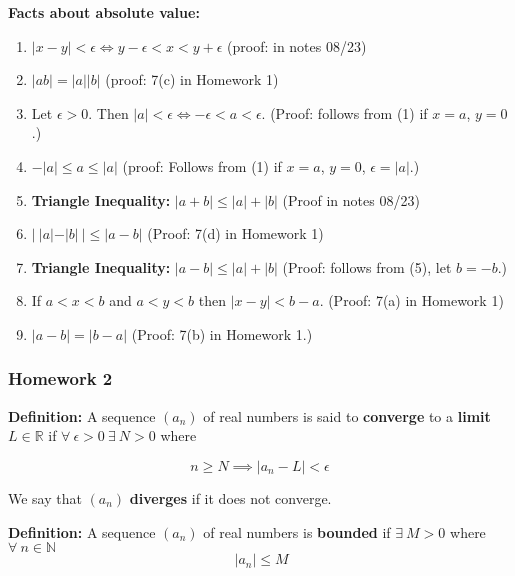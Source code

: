 
\textbf{Facts about absolute value:}

\begin{enumerate}[(1)]

\item \(|x-y| < \epsilon \iff y - \epsilon < x < y + \epsilon\) (proof: in notes 08/23)

\item \(|ab| = |a||b|\) (proof: 7(c) in Homework 1)

\item Let \(\epsilon >0\). Then \(|a| < \epsilon \iff -\epsilon < a < \epsilon\). (Proof: follows from (1) if \(x = a\), \(y = 0\).)

\item \(-|a| \leq a \leq |a|\) (proof: Follows from (1) if \(x = a\), \(y = 0\), \(\epsilon = |a|\).)

\item \textbf{Triangle Inequality:} \(|a + b| \leq |a| + |b|\) (Proof in notes 08/23)

\item \(|\ |a| - |b| \ | \leq |a - b|\) (Proof: 7(d) in Homework 1)

\item \textbf{Triangle Inequality:} \(|a - b| \leq |a| + |b|\) (Proof: follows from (5), let \(b = -b\).)

\item If \(a < x < b\) and \(a < y < b\) then \(|x - y| < b - a\). (Proof: 7(a) in Homework 1)

\item \(|a - b| = |b - a|\) (Proof: 7(b) in Homework 1.)

\end{enumerate}

\subsubsection{Homework 2}

\textbf{Definition:} A sequence \((a_n)\) of real numbers is said to \textbf{converge} to a \textbf{limit} \(L \in \mathbb{R}\) if \(\forall \ \epsilon > 0 \ \exists \ N > 0 \) where

\[
n \geq N \implies |a_n - L| < \epsilon
\]

We say that \((a_n)\) \textbf{diverges} if it does not converge.

\textbf{Definition:} A sequence \((a_n)\) of real numbers is \textbf{bounded} if \(\exists \ M > 0\) where \(\forall \ n \in \mathbb{N}\) \[\ |a_n| \leq M \]

